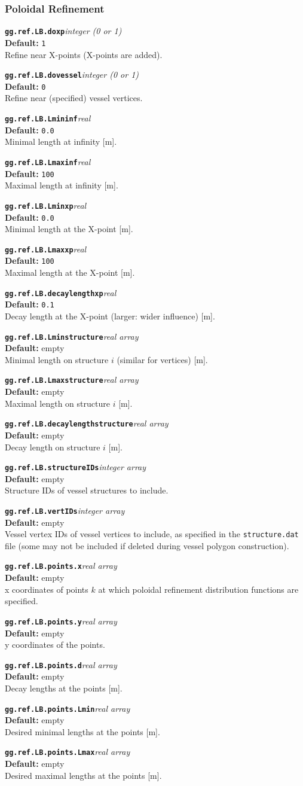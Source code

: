 \documentclass[10pt,a4paper]{article}
\newcommand{\sw}[4]{%
  \par\vspace{0.7em}%
  \begin{minipage}{\linewidth}\raggedright
    \textbf{\texttt{#1}}\hfill\textit{#2}\\[0.1em]
    \textbf{Default:} #3\\[0.1em]
    #4\par
    \vspace{0.3em}{\color{swgrey}\hrule}
  \end{minipage}\par}
\begin{document}
\subsubsection*{Poloidal Refinement}
\sw{gg.ref.LB.doxp}{integer (0 or 1)}{\texttt{1}}{Refine near X-points (X-points are added).}
\sw{gg.ref.LB.dovessel}{integer (0 or 1)}{\texttt{0}}{Refine near (specified) vessel vertices.}
\sw{gg.ref.LB.Lmininf}{real}{\texttt{0.0}}{Minimal length at infinity [m].}
\sw{gg.ref.LB.Lmaxinf}{real}{\texttt{100}}{Maximal length at infinity [m].}
\sw{gg.ref.LB.Lminxp}{real}{\texttt{0.0}}{Minimal length at the X-point [m].}
\sw{gg.ref.LB.Lmaxxp}{real}{\texttt{100}}{Maximal length at the X-point [m].}
\sw{gg.ref.LB.decaylengthxp}{real}{\texttt{0.1}}{Decay length at the X-point (larger: wider influence) [m].}
\sw{gg.ref.LB.Lminstructure}{real array}{empty}{Minimal length on structure $i$ (similar for vertices) [m].}
\sw{gg.ref.LB.Lmaxstructure}{real array}{empty}{Maximal length on structure $i$ [m].}
\sw{gg.ref.LB.decaylengthstructure}{real array}{empty}{Decay length on structure $i$ [m].}
\sw{gg.ref.LB.structureIDs}{integer array}{empty}{Structure IDs of vessel structures to include.}
\sw{gg.ref.LB.vertIDs}{integer array}{empty}{Vessel vertex IDs of vessel vertices to include, as specified in the \texttt{structure.dat} file (some may not be included if deleted during vessel polygon construction).}
\sw{gg.ref.LB.points.x}{real array}{empty}{x coordinates of points $k$ at which poloidal refinement distribution functions are specified.}
\sw{gg.ref.LB.points.y}{real array}{empty}{y coordinates of the points.}
\sw{gg.ref.LB.points.d}{real array}{empty}{Decay lengths at the points [m].}
\sw{gg.ref.LB.points.Lmin}{real array}{empty}{Desired minimal lengths at the points [m].}
\sw{gg.ref.LB.points.Lmax}{real array}{empty}{Desired maximal lengths at the points [m].}

\end{document}
